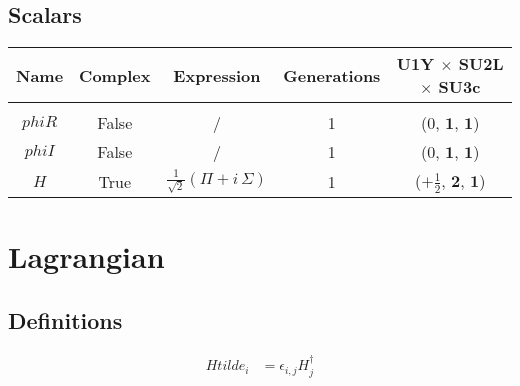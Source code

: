 \documentclass[12pt]{article}
\begin{document}
\subsection{Scalars}

\begin{table}[h]
\renewcommand{\arraystretch}{1.15}
\centering
\begin{tabular}{c@{\hskip .66cm}c@{\hskip .66cm}ccc}
\hline
Name & Complex & Expression & Generations & U1Y $\times$ SU2L $\times$ SU3c\\ \hline \\ [-2ex]
$phiR$ & False & / & 1 & ($0$, $\mathbf{1}$, $\mathbf{1}$) \\[.2cm]
$phiI$ & False & / & 1 & ($0$, $\mathbf{1}$, $\mathbf{1}$) \\[.2cm]
$H$ & True & $\frac{1}{\sqrt{2}} \left(\Pi + i\, \Sigma\right)$ & 1 & ($+\frac{1}{2}$, $\mathbf{2}$, $\mathbf{1}$) \\[.1cm] \hline
\end{tabular}
\end{table}

\section{Lagrangian}

\subsection{Definitions}
{\allowdisplaybreaks
\begin{align*}
Htilde{}_{i} &= \epsilon_{i,j} H^{\dagger}_{j}\\
\end{align*}
}
\end{document}
